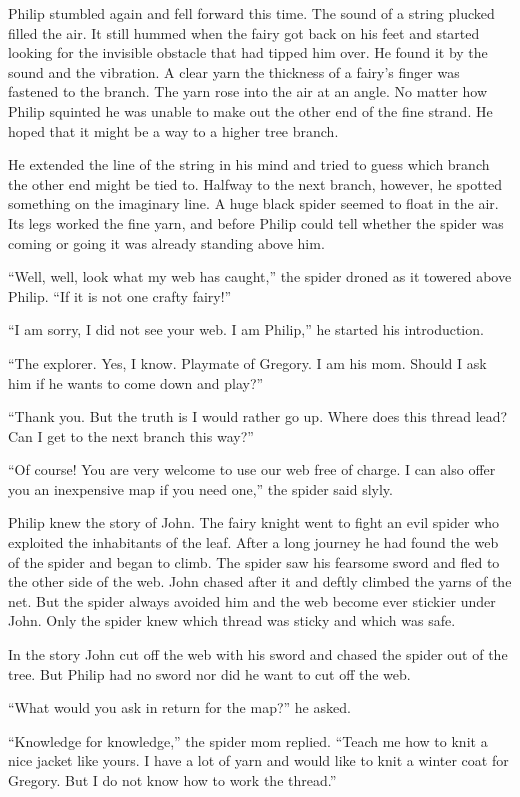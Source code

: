 \documentclass[10pt, draft]{memoir}
\begin{document}
Philip stumbled again and fell forward this time. The sound of a string plucked
filled the air. It still hummed when the fairy got back on his feet and started
looking for the invisible obstacle that had tipped him over. He found it by the
sound and the vibration. A clear yarn the thickness of a fairy's finger was
fastened to the branch. The yarn rose into the air at an angle. No matter how
Philip squinted he was unable to make out the other end of the fine strand. He
hoped that it might be a way to a higher tree branch.

He extended the line of the string in his mind and tried to guess which branch
the other end might be tied to. Halfway to the next branch, however, he spotted
something on the imaginary line. A huge black spider seemed to float in the
air. Its legs worked the fine yarn, and before Philip could tell whether the
spider was coming or going it was already standing above him.

``Well, well, look what my web has caught,'' the spider droned as it towered
above Philip. ``If it is not one crafty fairy!''

``I am sorry, I did not see your web. I am Philip,'' he started his
introduction.

``The explorer. Yes, I know. Playmate of Gregory. I am his mom. Should I ask
him if he wants to come down and play?''

``Thank you. But the truth is I would rather go up. Where does this thread
lead? Can I get to the next branch this way?''

``Of course! You are very welcome to use our web free of charge. I can also
offer you an inexpensive map if you need one,'' the spider said slyly.

Philip knew the story of John. The fairy knight went to fight an evil spider
who exploited the inhabitants of the leaf. After a long journey he had found
the web of the spider and began to climb. The spider saw his fearsome sword and
fled to the other side of the web. John chased after it and deftly climbed the
yarns of the net. But the spider always avoided him and the web become ever
stickier under John. Only the spider knew which thread was sticky and which was
safe.

In the story John cut off the web with his sword and chased the spider out of
the tree. But Philip had no sword nor did he want to cut off the web.

``What would you ask in return for the map?'' he asked.

``Knowledge for knowledge,'' the spider mom replied. ``Teach me how to knit a
nice jacket like yours. I have a lot of yarn and would like to knit a winter
coat for Gregory. But I do not know how to work the thread.''
\end{document}
